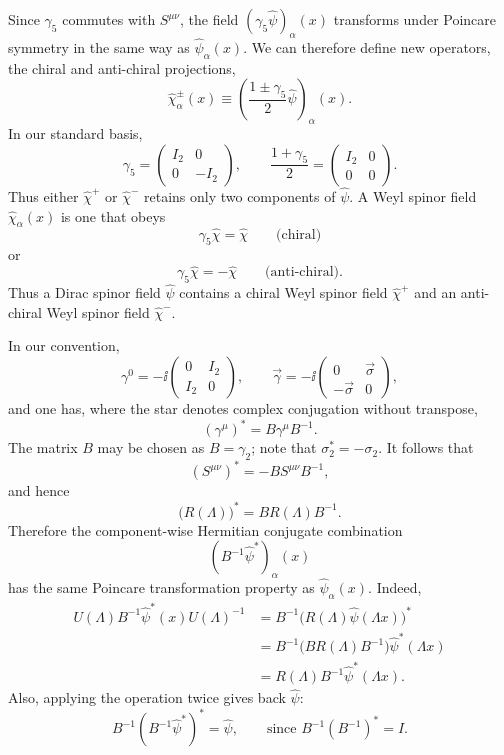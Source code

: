 Since \(\gamma_5\) commutes with \(S^{\mu\nu}\), the field
\((\gamma_5\widehat\psi)_\alpha(x)\) transforms under Poincare symmetry
in the same way as \(\widehat\psi_\alpha(x)\).  We can therefore define
new operators, the chiral and anti-chiral projections,
\[
  \widehat\chi_\alpha^\pm(x)
  \equiv
  \left(
    \frac{1\pm\gamma_5}{2}\widehat\psi
  \right)_\alpha(x).
\]
In our standard basis,
\[
  \gamma_5=
  \begin{pmatrix}
  I_2&0\\ 0&-I_2
  \end{pmatrix},
  \qquad
  \frac{1+\gamma_5}{2}
  =
  \begin{pmatrix}
  I_2&0\\ 0&0
  \end{pmatrix}.
\]
Thus either \(\widehat\chi^+\) or \(\widehat\chi^-\) retains only two
components of \(\widehat\psi\).  A Weyl spinor field
\(\widehat\chi_\alpha(x)\) is one that obeys
\[
  \gamma_5\widehat\chi=\widehat\chi
  \qquad\text{(chiral)}
\]
or
\[
  \gamma_5\widehat\chi=-\widehat\chi
  \qquad\text{(anti-chiral)}.
\]
Thus a Dirac spinor field \(\widehat\psi\) contains a chiral Weyl spinor
field \(\widehat\chi^+\) and an anti-chiral Weyl spinor field
\(\widehat\chi^-\).

In our convention,
\[
  \gamma^0=-\ii
  \begin{pmatrix}
  0&I_2\\ I_2&0
  \end{pmatrix},
  \qquad
  \vec\gamma=-\ii
  \begin{pmatrix}
  0&\vec\sigma\\ -\vec\sigma&0
  \end{pmatrix},
\]
and one has, where the star denotes complex conjugation without
transpose,
\[
  (\gamma^\mu)^*=B\gamma^\mu B^{-1}.
\]
The matrix \(B\) may be chosen as \(B=\gamma_2\); note that
\(\sigma_2^*=-\sigma_2\).  It follows that
\[
  (S^{\mu\nu})^*=-B S^{\mu\nu}B^{-1},
\]
and hence
\[
  \bigl(R(\Lambda)\bigr)^*=B R(\Lambda)B^{-1}.
\]
Therefore the component-wise Hermitian conjugate combination
\[
  \left(B^{-1}\widehat\psi^*\right)_\alpha(x)
\]
has the same Poincare transformation property as
\(\widehat\psi_\alpha(x)\).  Indeed,
\[
\begin{aligned}
  U(\Lambda)B^{-1}\widehat\psi^*(x)U(\Lambda)^{-1}
  &=
  B^{-1}\bigl(R(\Lambda)\widehat\psi(\Lambda x)\bigr)^*
  \\
  &=
  B^{-1}\bigl(BR(\Lambda)B^{-1}\bigr)\widehat\psi^*(\Lambda x)
  \\
  &=
  R(\Lambda)B^{-1}\widehat\psi^*(\Lambda x).
\end{aligned}
\]
Also, applying the operation twice gives back \(\widehat\psi\):
\[
  B^{-1}\left(B^{-1}\widehat\psi^*\right)^*=\widehat\psi,
  \qquad
  \text{since } B^{-1}(B^{-1})^*=I.
\]

